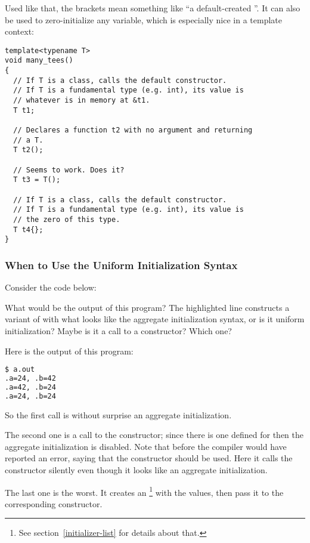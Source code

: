 Used like that, the brackets mean something like ``a default-created
''. It can also be used to zero-initialize any variable,
which is especially nice in a template context:

\begin{lstlisting}
template<typename T>
void many_tees()
{
  // If T is a class, calls the default constructor.
  // If T is a fundamental type (e.g. int), its value is
  // whatever is in memory at &t1.
  T t1;

  // Declares a function t2 with no argument and returning
  // a T.
  T t2();

  // Seems to work. Does it?
  T t3 = T();

  // If T is a class, calls the default constructor.
  // If T is a fundamental type (e.g. int), its value is
  // the zero of this type.
  T t4{};
}
\end{lstlisting}

\subsubsection{When to Use the Uniform Initialization Syntax}

Consider the code below:


What would be the output of this program? The highlighted line
constructs a variant of  with what looks like the aggregate
initialization syntax, or is it uniform initialization? Maybe is it a
call to a constructor? Which one?

Here is the output of this program:

\begin{lstlisting}[language=bash]
$ a.out
.a=24, .b=42
.a=42, .b=24
.a=24, .b=24
\end{lstlisting}

So the first call is without surprise an aggregate initialization.

The second one is a call to the constructor; since there is one
defined for  then the aggregate initialization
is disabled. Note that before  the compiler would have reported
an error, saying that the constructor should be used. Here it calls
the constructor silently even though it looks like an aggregate
initialization.

The last one is the worst. It creates an 
\footnote{See section~\ref{initializer-list} for details about that.}
with the values, then pass it to the corresponding constructor.

